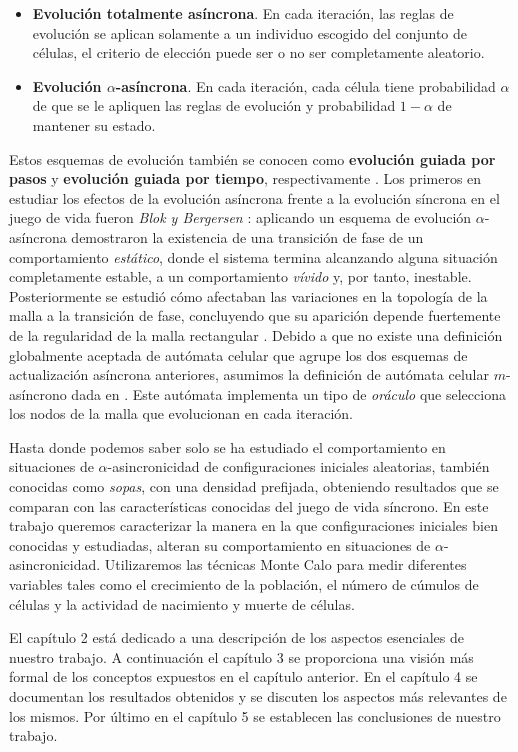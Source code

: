\documentclass[../proyecto.tex]{book}
\begin{document}
\begin{itemize}
	\item \textbf{Evolución totalmente asíncrona}. En cada iteración, las reglas de evolución se aplican solamente a un individuo escogido del conjunto de células, el criterio de elección puede ser o no ser completamente aleatorio.
	\item \textbf{Evolución $\alpha$-asíncrona}. En cada iteración, cada célula tiene probabilidad $\alpha$ de que se le apliquen las reglas de evolución y probabilidad $1-\alpha$ de mantener su estado.
\end{itemize}

Estos esquemas de evolución también se conocen como \textbf{evolución guiada por pasos} y \textbf{evolución guiada por tiempo}, respectivamente \cite{aka}. Los primeros en estudiar los efectos de la evolución asíncrona frente a la evolución síncrona en el juego de vida fueron \textit{Blok y Bergersen} \cite{syncVSasync}: aplicando un esquema de evolución $\alpha$-asíncrona demostraron la existencia de una transición de fase de un comportamiento \textit{estático}, donde el sistema termina alcanzando alguna situación completamente estable, a un comportamiento \textit{vívido} y, por tanto, inestable. Posteriormente se estudió cómo afectaban las variaciones en la topología de la malla a la transición de fase, concluyendo que su aparición depende fuertemente de la regularidad de la malla rectangular \cite{mallaIrregular}. Debido a que no existe una definición globalmente aceptada de autómata celular que agrupe los dos esquemas de actualización asíncrona anteriores, asumimos la definición de autómata celular $m$-asíncrono dada en \cite{oraculo}. Este autómata implementa un tipo de \textit{oráculo} que selecciona los nodos de la malla que evolucionan en cada iteración. 

Hasta donde podemos saber solo se ha estudiado el comportamiento en situaciones de $\alpha$-asincronicidad de configuraciones iniciales aleatorias, también conocidas como \textit{sopas}, con una densidad prefijada, obteniendo resultados que se comparan con las características conocidas del juego de vida síncrono. En este trabajo queremos caracterizar la manera en la que configuraciones iniciales bien conocidas y estudiadas, alteran su comportamiento en situaciones de $\alpha$-asincronicidad. Utilizaremos las técnicas Monte Calo para medir diferentes variables tales como el crecimiento de la población, el número de cúmulos de células y la actividad de nacimiento y muerte de células.

El capítulo 2 está dedicado a una descripción de los aspectos esenciales de nuestro trabajo. A continuación el capítulo 3 se proporciona una visión más formal de los conceptos expuestos en el capítulo anterior. En el capítulo 4 se documentan los resultados obtenidos y se discuten los aspectos más relevantes de los mismos. Por último en el capítulo 5 se establecen las conclusiones de nuestro trabajo. 
\end{document}
